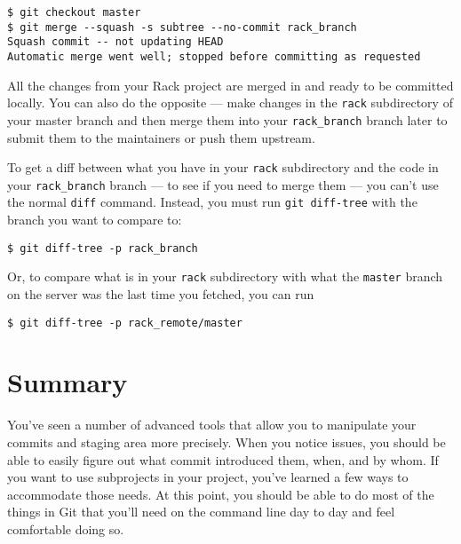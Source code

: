 \documentclass[a4paper]{book}
\newcounter{tab}[chapter]
\begin{document}
\begin{shaded}\begin{verbatim}
$ git checkout master
$ git merge --squash -s subtree --no-commit rack_branch
Squash commit -- not updating HEAD
Automatic merge went well; stopped before committing as requested
\end{verbatim}\end{shaded}

All the changes from your Rack project are merged in and ready to be committed locally. You can also do the opposite --- make changes in the \texttt{rack} subdirectory of your master branch and then merge them into your \texttt{rack\_branch} branch later to submit them to the maintainers or push them upstream.

To get a diff between what you have in your \texttt{rack} subdirectory and the code in your \texttt{rack\_branch} branch --- to see if you need to merge them --- you can't use the normal \texttt{diff} command. Instead, you must run \texttt{git diff-tree} with the branch you want to compare to:

\begin{shaded}\begin{verbatim}
$ git diff-tree -p rack_branch
\end{verbatim}\end{shaded}

Or, to compare what is in your \texttt{rack} subdirectory with what the \texttt{master} branch on the server was the last time you fetched, you can run

\begin{shaded}\begin{verbatim}
$ git diff-tree -p rack_remote/master
\end{verbatim}\end{shaded}

\section{Summary}\label{summary-6}

You've seen a number of advanced tools that allow you to manipulate your commits and staging area more precisely. When you notice issues, you should be able to easily figure out what commit introduced them, when, and by whom. If you want to use subprojects in your project, you've learned a few ways to accommodate those needs. At this point, you should be able to do most of the things in Git that you'll need on the command line day to day and feel comfortable doing so.
\end{document}
